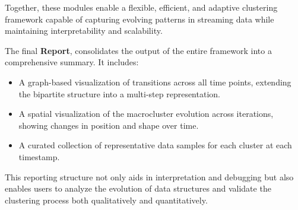 

Together, these modules enable a flexible, efficient, and adaptive clustering
framework capable of capturing evolving patterns in streaming data while
maintaining interpretability and scalability.

The final \textbf{Report}, consolidates the output of the entire framework into
a comprehensive summary. It includes:
\begin{itemize}
      \item A graph-based visualization of transitions across all time points, extending
            the bipartite structure into a multi-step representation.
      \item A spatial visualization of the macrocluster evolution across iterations,
            showing changes in position and shape over time.
      \item A curated collection of representative data samples for each cluster at each
            timestamp.
\end{itemize}

This reporting structure not only aids in interpretation and debugging but
also enables users to analyze the evolution of data structures and validate the
clustering process both qualitatively and quantitatively.